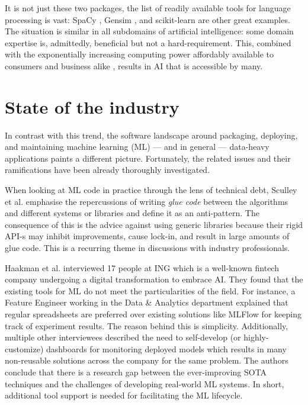 It is not just these two packages, the list of readily available tools for language processing is vast: SpaCy \cite{srinivasa2018natural}, Gensim \cite{vrehuuvrek2011gensim}, and scikit-learn \cite{pedregosa2011scikit} are other great examples. The situation is similar in all subdomains of artificial intelligence: some domain expertise is, admittedly, beneficial but not a hard-requirement. This, combined with the exponentially increasing computing power affordably available to consumers and business alike \cite{sun2019summarizing}, results in AI that is accessible by many.

\section{State of the industry} \label{section:industry}

In contrast with this trend, the software landscape around packaging, deploying, and maintaining machine learning (ML) --- and in general --- data-heavy applications paints a different picture. Fortunately, the related issues and their ramifications have been already thoroughly investigated.

When looking at ML code in practice through the lens of technical debt, Sculley et al. \cite{sculley2015hidden} emphasise the repercussions of writing \textit{glue code} between the algorithms and different systems or libraries and define it as an anti-pattern. The consequence of this is the advice against using generic libraries because their rigid API-s may inhibit improvements, cause lock-in, and result in large amounts of glue code. This is a recurring theme in discussions with industry professionals.

Haakman et al. \cite{haakman2021ai} interviewed 17 people at ING which is a well-known fintech company undergoing a digital transformation to embrace AI. They found that the existing tools for ML do not meet the particularities of the field. For instance, a Feature Engineer working in the Data \& Analytics department explained that regular spreadsheets are preferred over existing solutions like MLFlow for keeping track of experiment results. The reason behind this is simplicity. Additionally, multiple other interviewees described the need to self-develop (or highly-customize) dashboards for monitoring deployed models which results in many non-reusable solutions across the company for the same problem. The authors conclude that there is a research gap between the ever-improving SOTA techniques and the challenges of developing real-world ML systems. In short, additional tool support is needed for facilitating the ML lifecycle.

